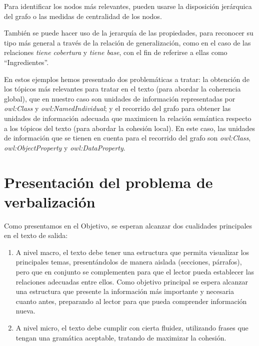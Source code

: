 Para identificar los nodos más relevantes, pueden usarse la disposición jerárquica del grafo o las medidas de centralidad de los nodos.

También se puede hacer uso de la jerarquía de las propiedades, para reconocer su tipo más general a través de la relación de generalización, como en el caso de las relaciones \emph{tiene cobertura} y \emph{tiene base}, con el fin de referirse a ellas como ``Ingredientes''.

En estos ejemplos hemos presentado dos problemáticas a tratar: la obtención de los tópicos más relevantes para tratar en el texto (para abordar la coherencia global), que en nuestro caso son unidades de información representadas por \emph{owl:Class} y \emph{owl:NamedIndividual}; y el recorrido del grafo para obtener las unidades de información adecuada que maximicen la relación semántica respecto a los tópicos del texto (para abordar la cohesión local). En este caso, las unidades de información que se tienen en cuenta para el recorrido del grafo son \emph{owl:Class}, \emph{owl:ObjectProperty} y \emph{owl:DataProperty}.
 
\section{Presentación del problema de verbalización}
Como presentamos en el Objetivo, se esperan alcanzar dos cualidades principales en el texto de salida:
\begin{enumerate}
    \item A nivel macro, el texto debe tener una estructura que permita visualizar los principales temas, presentándolos de manera aislada (secciones, párrafos), pero que en conjunto se complementen para que el lector pueda establecer las relaciones adecuadas entre ellos. Como objetivo principal se espera alcanzar una estructura que presente la información más importante y necesaria cuanto antes, preparando al lector para que pueda comprender información nueva.
    \item A nivel micro, el texto debe cumplir con cierta fluidez, utilizando frases que tengan una gramática aceptable, tratando de maximizar la cohesión.
\end{enumerate}{}